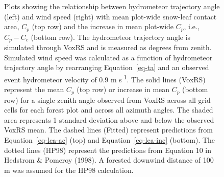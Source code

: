 \documentclass[
  letterpaper,
  DIV=11,
  numbers=noendperiod]{scrartcl}
\begin{document}
\begin{figure}[H]


\caption{\label{fig-lca-ht-ws}Plots showing the relationship between
hydrometeor trajectory angle (left) and wind speed (right) with mean
plot-wide snow-leaf contact area, \(C_p\) (top row) and the increase in
mean plot-wide \(C_p\), i.e., \(C_p - C_c\) (bottom row). The
hydrometeor trajectory angle is simulated through VoxRS and is measured
as degrees from zenith. Simulated wind speed was calculated as a
function of hydrometeor trajectory angle by rearranging
Equation~\ref{eq-ta} and an observed event hydrometeor velocity of 0.9 m
s\textsuperscript{-1}. The solid lines (VoxRS) represent the mean
\(C_p\) (top row) or increase in mean \(C_p\) (bottom row) for a single
zenith angle observed from VoxRS across all grid cells for each forest
plot and across all azimuth angles. The shaded area represents 1
standard deviation above and below the observed VoxRS mean. The dashed
lines (Fitted) represent predictions from Equation~\ref{eq-lca-ac} (top)
and Equation~\ref{eq-lca-inc} (bottom). The dotted lines (HP98)
represent the predictions from Equation 10 in Hedstrom \& Pomeroy
(1998). A forested downwind distance of 100 m was assumed for the HP98
calculation.}

\end{figure}%
\end{document}
